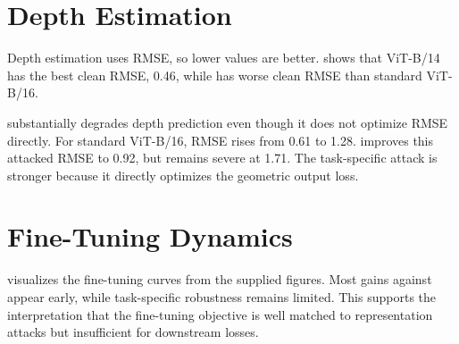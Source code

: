 \section{Depth Estimation}

Depth estimation uses RMSE, so lower values are better.  shows that \DINOv ViT-B/14 has the best clean RMSE, 0.46, while \DeACL has worse clean RMSE than standard \DINO ViT-B/16.

\begin{table}[t]
    \centering
    \small
    \caption{NYU-Depth v2 robustness. \DeACL reduces \EmbedAttack damage but barely changes \DepthPGD damage.}
    \label{tab:depth}
\end{table}

\EmbedAttack substantially degrades depth prediction even though it does not optimize RMSE directly. For standard \DINO ViT-B/16, RMSE rises from 0.61 to 1.28. \DeACL improves this attacked RMSE to 0.92, but \DepthPGD remains severe at 1.71. The task-specific attack is stronger because it directly optimizes the geometric output loss.

\section{Fine-Tuning Dynamics}

 visualizes the \DeACL fine-tuning curves from the supplied figures. Most gains against \EmbedAttack appear early, while task-specific robustness remains limited. This supports the interpretation that the fine-tuning objective is well matched to representation attacks but insufficient for downstream losses.

